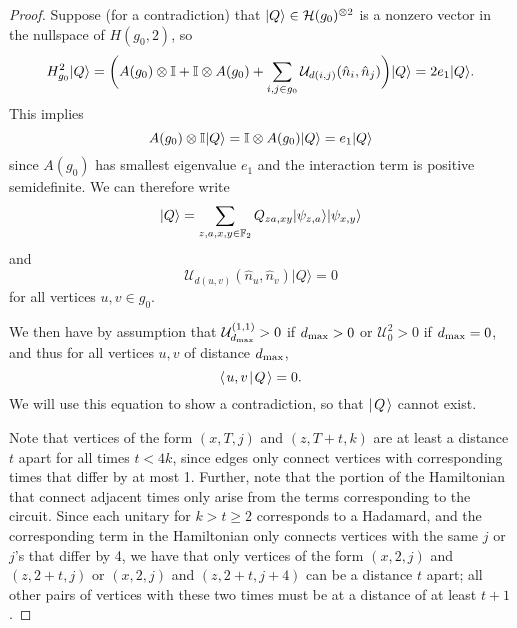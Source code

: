 \documentclass[../thesis-main/thesis-main]{subfiles}
\begin{document}
\begin{proof}
Suppose (for a contradiction) that $|Q\rangle\in \mathcal{H}(g_0)^{\otimes 2}$ is a nonzero vector in the nullspace of $H(g_{0},2)$, so 
\begin{equation}
  H_{g_{0}}^{2}|Q\rangle
    =\bigg(A(g_{0})\otimes\mathbb{I}+\mathbb{I}\otimes A(g_{0})+\sum_{i,j \in g_{0}}\mathcal{U}_{d(i,j)}(\hat{n}_i,\hat{n}_j)\bigg)|Q\rangle=2e_{1}|Q\rangle.
\end{equation}
This implies 
\begin{equation}
  A(g_{0})\otimes\mathbb{I}|Q\rangle=\mathbb{I}\otimes A(g_{0})|Q\rangle=e_{1}|Q\rangle
\end{equation}
since $A(g_0)$ has smallest eigenvalue $e_1$ and the interaction term is positive semidefinite. We can therefore write 
\begin{equation}
  |Q\rangle=\sum_{z,a,x,y\in \mathbb{F}_2}Q_{za,xy}|\psi_{z,a}\rangle|\psi_{x,y}\rangle
\end{equation}
and 
\begin{equation}
  \mathcal{U}_{d(u,v)}(\hat{n}_u,\hat{n}_v)|Q\rangle=0
\end{equation}
for all vertices $u,v\in g_{0}.$ 


We then have by assumption that  $\mathcal{U}^{(1,1)}_{d_{\text{max}}} >  0$ if $d_{\text{max}} > 0$ or $\mathcal{U}^{2}_{0} > 0$ if $d_{\text{max}} = 0$,  and thus for all vertices $u,v$ of distance $d_{\text{max}}$, 
\begin{equation}
  \langle\mspace{2mu} u,v \mspace{2mu} | \mspace{2mu} Q\mspace{2mu} \rangle = 0\label{eq:dmin_annihilate}.
\end{equation}
We will use this equation to show a contradiction, so that $|\mspace{2mu} Q \mspace{2mu} \rangle$ cannot exist.

Note that vertices of the form $(x,T,j)$ and $(z,T+t,k)$ are at least a distance $t$ apart for all times $t < 4 k$, since edges only connect vertices with corresponding times that differ by at most 1.  Further, note that the portion of the Hamiltonian that connect adjacent times only arise from the terms corresponding to the circuit.  Since each unitary for $k > t\geq 2$ corresponds to a Hadamard, and the corresponding term in the Hamiltonian only connects vertices with the same $j$ or $j$'s that differ by 4, we have that only vertices of the form $(x,2,j)$ and $(z,2+t,j)$ or $(x,2,j)$ and $(z,2+t,j+4)$ can be a distance $t$ apart; all other pairs of vertices with these two times must be at a distance of at least $t+1$.


\end{proof}
\end{document}
